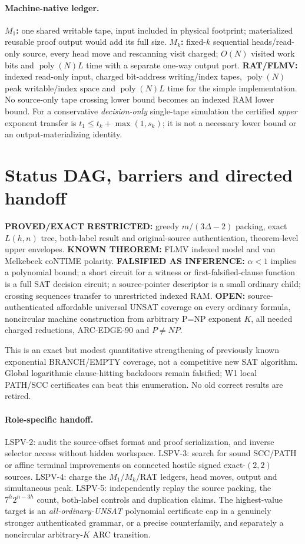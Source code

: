 \documentclass[11pt]{article}
\begin{document}
\paragraph{Machine-native ledger.}
\textbf{$M_1$:} one shared writable tape, input included in physical footprint; materialized reusable proof output would add its full size. \textbf{$M_k$:} fixed-$k$ sequential heads/read-only source, every head move and rescanning visit charged; $O(N)$ visited work bits and $\operatorname{poly}(N)L$ time with a separate one-way output port. \textbf{RAT/FLMV:} indexed read-only input, charged bit-address writing/index tapes, $\operatorname{poly}(N)$ peak writable/index space and $\operatorname{poly}(N)L$ time for the simple implementation. No source-only tape crossing lower bound becomes an indexed RAM lower bound. For a conservative \emph{decision-only} single-tape simulation the certified \emph{upper} exponent transfer is $t_1\le t_k+\max(1,s_k)$; it is not a necessary lower bound or an output-materializing identity.

\section{Status DAG, barriers and directed handoff}
\textbf{PROVED/EXACT RESTRICTED:} greedy $m/(3\Delta-2)$ packing, exact $L(h,n)$ tree, both-label result and original-source authentication, theorem-level upper envelopes. \textbf{KNOWN THEOREM:} FLMV indexed model and van Melkebeek coNTIME polarity. \textbf{FALSIFIED AS INFERENCE:} $\alpha<1$ implies a polynomial bound; a short circuit for a witness or first-falsified-clause function is a full SAT decision circuit; a source-pointer descriptor is a small ordinary child; crossing sequences transfer to unrestricted indexed RAM. \textbf{OPEN:} source-authenticated affordable universal UNSAT coverage on every ordinary formula, noncircular machine construction from arbitrary P=NP exponent $K$, all needed charged reductions, ARC-EDGE-90 and $P\ne NP$.

This is an exact but modest quantitative strengthening of previously known exponential BRANCH/EMPTY coverage, not a competitive new SAT algorithm. Global logarithmic clause-hitting backdoors remain falsified; W1 local PATH/SCC certificates can beat this enumeration. No old correct results are retired.

\paragraph{Role-specific handoff.}
LSPV-2: audit the source-offset format and proof serialization, and inverse selector access without hidden workspace. LSPV-3: search for sound SCC/PATH or affine terminal improvements on connected hostile signed exact-$(2,2)$ sources. LSPV-4: charge the $M_1/M_k$/RAT ledgers, head moves, output and simultaneous peak. LSPV-5: independently replay the source packing, the $7^h2^{n-3h}$ count, both-label controls and duplication claims. The highest-value target is an \emph{all-ordinary-UNSAT} polynomial certificate cap in a genuinely stronger authenticated grammar, or a precise counterfamily, and separately a noncircular arbitrary-$K$ ARC transition.
\end{document}
